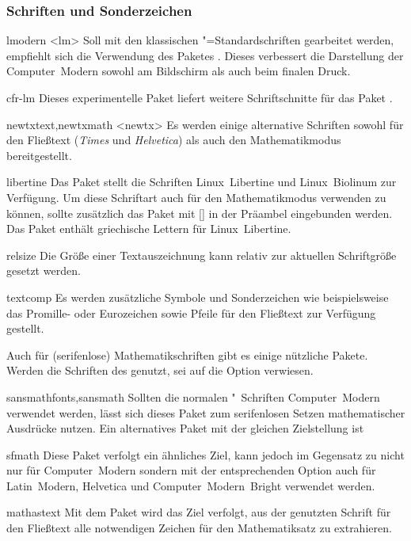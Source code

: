 \subsubsection{Schriften und Sonderzeichen}
\begin{packages}
\item[lmodern]<lm>
  Soll mit den klassischen "=Standardschriften gearbeitet werden, 
  empfiehlt sich die Verwendung des Paketes . Dieses 
  verbessert die Darstellung der Computer~Modern sowohl am Bildschirm als auch 
  beim finalen Druck.
\item[cfr-lm]
  Dieses experimentelle Paket liefert weitere Schriftschnitte für das Paket 
  .
\item[newtxtext,newtxmath]<newtx>
  Es werden einige alternative Schriften sowohl für den Fließtext 
  (\textit{Times} und \textit{Helvetica}) als auch den Mathematikmodus 
  bereitgestellt.
\item[libertine]
  Das Paket stellt die Schriften Linux~Libertine und Linux~Biolinum zur 
  Verfügung. Um diese Schriftart auch für den Mathematikmodus verwenden zu 
  können, sollte zusätzlich das Paket  mit 
  [] in der 
  Präambel eingebunden werden. Das Paket  enthält griechische 
  Lettern für Linux~Libertine.
\item[relsize]
  Die Größe einer Textauszeichnung kann relativ zur aktuellen Schriftgröße 
  gesetzt werden.
\item[textcomp]
  Es werden zusätzliche Symbole und Sonderzeichen wie beispielsweise das 
  Promille- oder Eurozeichen sowie Pfeile für den Fließtext zur Verfügung 
  gestellt.
\end{packages}
%
%
Auch für (serifenlose) Mathematikschriften gibt es einige nützliche Pakete. 
Werden die Schriften des \CDs genutzt, sei auf die Option  
verwiesen.
%
\begin{packages}
\item[sansmathfonts,sansmath]
  Sollten die normalen "~Schriften Computer~Modern verwendet 
  werden, lässt sich dieses Paket zum serifenlosen Setzen mathematischer 
  Ausdrücke nutzen. Ein alternatives Paket mit der gleichen Zielstellung ist 
\item[sfmath]
  Diese Paket verfolgt ein ähnliches Ziel, kann jedoch im Gegensatz zu 
   nicht nur für Computer~Modern sondern mit der 
  entsprechenden Option auch für Latin~Modern, Helvetica und 
  Computer~Modern~Bright verwendet werden.
\item[mathastext]
  Mit dem Paket wird das Ziel verfolgt, aus der genutzten Schrift für den 
  Fließtext alle notwendigen Zeichen für den Mathematiksatz zu extrahieren.
\end{packages}



